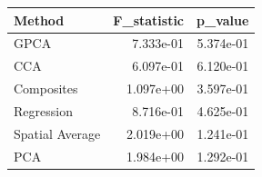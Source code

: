 \begin{tabular}{lrr}
\toprule
Method & F_statistic & p_value \\
\midrule
GPCA & 7.333e-01 & 5.374e-01 \\
CCA & 6.097e-01 & 6.120e-01 \\
Composites & 1.097e+00 & 3.597e-01 \\
Regression & 8.716e-01 & 4.625e-01 \\
Spatial Average & 2.019e+00 & 1.241e-01 \\
PCA & 1.984e+00 & 1.292e-01 \\
\bottomrule
\end{tabular}
